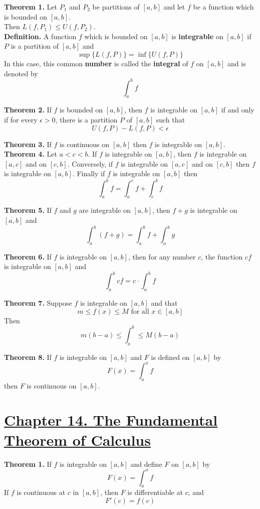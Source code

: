 \documentclass[10pt,letterpaper]{article}
\begin{document}
	\textbf{Theorem 1. } Let $P_1$ and $P_2$ be partitions of $[a, b]$ and let $f$ be a function
	which is bounded on $[a, b]$. \\ Then $L(f, P_1) \leq U(f, P_2)$. \\
	
	\textbf{Definition. } A function $f$ which is bounded on $[a, b]$ is \textbf{integrable} on $[a, b]$
	if $P$ is a partition of $[a, b]$ and 
	$$\sup\{L(f, P)\} = \inf\{U(f, P)\}$$
	In this case, this common \textbf{number} is called the \textbf{integral} of $f$ on $[a, b]$ and is denoted by
	$$\displaystyle\int_{a}^{b} f$$
	
	\textbf{Theorem 2. } If $f$ is bounded on $[a, b]$, then $f$ is integrable on $[a, b]$ if and only if
	for every $\epsilon > 0$, there is a partition $P$ of $[a, b]$ such that
	$$U(f, P) - L(f, P) < \epsilon$$
	
	\textbf{Theorem 3. } If $f$ is continuous on $[a, b]$ then $f$ is integrable on $[a, b]$. \\
	
	\textbf{Theorem 4. } Let $a < c < b$. If $f$ is integrable on $[a, b]$, then $f$ is integrable
	on $[a, c]$ and on $[c, b]$. Conversely, if $f$ is integrable on $[a, c]$ and on $[c, b]$ then 
	$f$ is integrable on $[a, b]$. Finally if $f$ is integrable on $[a, b]$ then 
	$$\displaystyle\int_{a}^{b} f = \displaystyle\int_{a}^{c} f + \displaystyle\int_{c}^{b} f$$
	
	\textbf{Theorem 5. } If $f$ and $g$ are integrable on $[a, b]$, then $f + g$ is integrable
	on $[a, b]$ and 
	$$\displaystyle\int_{a}^{b} (f + g) = \displaystyle\int_{a}^{b} f + \displaystyle\int_{a}^{b} g$$
	
	\textbf{Theorem 6. } If $f$ is integrable on $[a, b]$, then for any number $c$, the function
	$cf$ is integrable on $[a, b]$ and 
	$$\displaystyle\int_{a}^{b} cf = c \cdot \displaystyle\int_{a}^{b} f$$
	
	\textbf{Theorem 7. } Suppose $f$ is integrable on $[a, b]$ and that
	$$m \leq f(x) \leq M \text{ for all } x \in [a, b]$$
	Then 
	$$m(b - a) \leq \displaystyle\int_{a}^{b} \leq M(b - a)$$
	
	\textbf{Theorem 8. } If $f$ is integrable on $[a, b]$ and $F$ is defined on $[a, b]$
	by 
	$$F(x) = \displaystyle\int_{a}^{x} f$$
	then $F$ is continuous on $[a, b]$. \\
	
	
	\section*{{\color{red}\underline{Chapter 14. The Fundamental Theorem of Calculus}}}
	\textbf{Theorem 1. } If $f$ is integrable on $[a, b]$ and define $F$ on $[a, b]$ by
	$$F(x) = \displaystyle\int_{a}^{x} f$$
	If $f$ is continuous at $c$ in $[a, b]$, then $F$ is differentiable at $c$, and 
	$$F'(c) = f(c)$$
	
\end{document}
